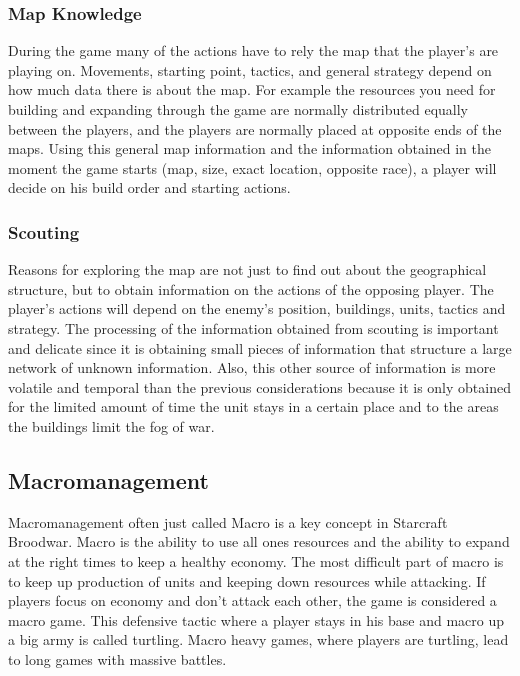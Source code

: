 			\subsubsection{Map Knowledge}
				During the game many of the actions have to rely the map that the player's are playing on. Movements, starting point, 
				tactics, and general strategy depend on how much data there is about the map. 				
				For example the resources you need for building and expanding through the game are normally distributed
				equally between the players, and the players are normally placed at opposite ends of the maps. 
				Using this general map information and the information obtained in the moment the game starts 
				(map, size, exact location, opposite race), a player will decide on his build order and starting actions. 
		
			\subsubsection{Scouting}
				Reasons for exploring the map are not just to find out about the geographical structure, 
				but to obtain information on the actions of the opposing player. The player's actions will depend on
				the enemy's position, buildings, units, tactics and strategy. The processing of the information 
				obtained from scouting is important and delicate since it is obtaining small pieces of information 
				that structure a large network of unknown information. Also, this other source of information 
				is more volatile and temporal than the previous considerations because it is only obtained for the 
				limited amount of time the unit stays in a certain place and to the areas the buildings limit the fog of war.
				
	\subsection{Macromanagement}
		Macromanagement often just called Macro is a key concept in Starcraft Broodwar. 
		Macro is the ability to use all ones resources and the ability to expand at the right times to keep a healthy economy.
		The most difficult part of macro is to keep up production of units and keeping down resources while attacking.
		If players focus on economy and don't attack each other, the game is considered a macro game. This defensive tactic where a
		player stays in his base and macro up a big army is called turtling. Macro heavy games, where players are turtling, lead to
		long games with massive battles. 
			
